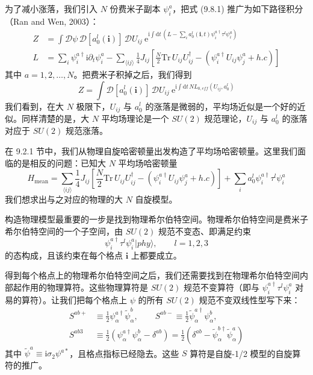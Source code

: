 为了减小涨落，我们引入 $N$ 份费米子副本 $\psi_i^a$，把式 (9.8.1) 推广为如下路径积分（Ran and Wen, 2003）：
\begin{equation*}
\begin{aligned}
Z &= \int \mathcal{D}\psi\,\mathcal{D}[a_0^l(\pmb{i})]\,\mathcal{D}U_{ij}\ \mathrm{e}^{\mathrm{i}\int\mathrm{d}t\,(L-\sum_i a_0^l(\pmb{i},t)\psi_i^{a\dagger}\tau^{l}\psi_i^{a})} \\
L &= \sum_i \psi_i^{a\dagger}\mathrm{i}\partial_t\psi_i^{a}-\sum_{\langle ij\rangle}\frac{1}{4}J_{ij}\left[\frac{N}{2}\mathrm{Tr}\,U_{ij}U_{ij}^{\dagger}-(\psi_i^{a\dagger}U_{ij}\psi_j^{a}+h.c)\right]
\end{aligned}
\tag{9.8.2}
\end{equation*}
其中 $a=1,2,\dots,N$。把费米子积掉之后，我们得到
\begin{equation*}
Z=\int \mathcal{D}[a_0^l(\pmb{i})]\,\mathcal{D}U_{ij}\ \mathrm{e}^{\mathrm{i}\int\mathrm{d}t\,N L_{0,eff}(U_{ij},a_0^l)}
\end{equation*}
我们看到，在大 $N$ 极限下，$U_{ij}$ 与 $a_0^l$ 的涨落是微弱的，平均场近似是一个好的近似。同样清楚的是，大 $N$ 平均场理论是一个 $SU(2)$ 规范理论，$U_{ij}$ 与 $a_0^l$ 的涨落对应于 $SU(2)$ 规范涨落。

在 9.2.1 节中，我们从物理自旋哈密顿量出发构造了平均场哈密顿量。这里我们面临的是相反的问题：已知大 $N$ 平均场哈密顿量
\begin{equation*}
H_{\text{mean}}=\sum_{\langle ij\rangle}\frac{1}{4}J_{ij}\left[\frac{N}{2}\mathrm{Tr}\,U_{ij}U_{ij}^{\dagger}-(\psi_i^{a\dagger}U_{ij}\psi_j^{a}+h.c)\right]+\sum_i a_0^l\psi_i^{a\dagger}\tau^{l}\psi_i^{a}
\tag{9.8.3}
\end{equation*}
我们想求出与之对应的物理的大 $N$ 自旋模型。

构造物理模型最重要的一步是找到物理希尔伯特空间。物理希尔伯特空间是费米子希尔伯特空间的一个子空间，由 $SU(2)$ 规范不变态、即满足约束
\begin{equation*}
\psi_i^{a\dagger}\tau^{l}\psi_i^{a}|phy\rangle,\qquad l=1,2,3
\end{equation*}
的态构成，且该约束在每个格点 $\pmb{i}$ 上都要成立。

得到每个格点上的物理希尔伯特空间之后，我们还需要找到在物理希尔伯特空间内部起作用的物理算符。这些物理算符是 $SU(2)$ 规范不变算符（即与 $\psi_i^{a\dagger}\tau^{l}\psi_i^{a}$ 对易的算符）。让我们把每个格点上 $\psi$ 的所有 $SU(2)$ 规范不变双线性型写下来：
\begin{equation*}
\begin{aligned}
S^{ab+}&\equiv\frac{1}{2}\psi_\alpha^{a\dagger}\tilde\psi_\alpha^{b},\qquad
S^{ab-}\equiv\frac{1}{2}\tilde\psi_\alpha^{a\dagger}\psi_\alpha^{b},\\
S^{ab3}&\equiv\frac{1}{2}\left(\psi_\alpha^{a\dagger}\psi_\alpha^{b}-\delta^{ab}\right)
=\frac{1}{2}\left(\delta^{ab}-\tilde\psi_\alpha^{b\dagger}\tilde\psi_\alpha^{a}\right)
\end{aligned}
\end{equation*}
其中 $\tilde\psi^{a}\equiv\mathrm{i}\sigma_2\psi^{a*}$，且格点指标已经隐去。这些 $S$ 算符是自旋-1/2 模型的自旋算符的推广。

